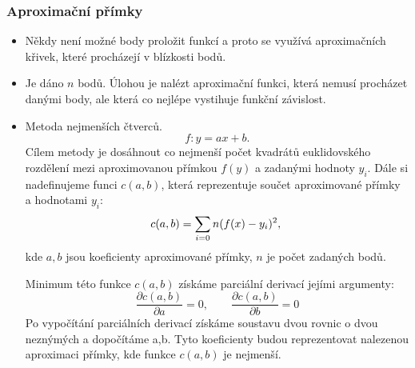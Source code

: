 \subsubsection{Aproximační přímky}
\begin{itemize}
\item Někdy není možné body proložit funkcí a proto se využívá aproximačních křivek, které procházejí v blízkosti bodů.
\item Je dáno $n$ bodů. Úlohou je nalézt aproximační funkci, která nemusí procházet danými body, ale která co nejlépe vystihuje funkční závislost. 
\item Metoda nejmenších čtverců. 
			\begin{equation}
			\label{rovnicePrimky} 
			  f: y = ax + b.
			\end{equation}
			Cílem metody je dosáhnout co nejmenší počet kvadrátů euklidovského rozdělení mezi aproximovanou přímkou $f(y)$ a zadanými hodnoty $y_{i}$. Dále si nadefinujeme funci $c(a,b)$, která reprezentuje součet aproximované přímky a hodnotami $y_{i}$:
			\begin{equation}  
			\label{soucetPrimky}
			  c(a,b) = \sum_{i=0}{n} (f(x) - y_{i})^2, \\
			\end{equation}
			kde $a, b$ jsou koeficienty aproximované přímky, $n$ je počet zadaných bodů. 

			Minimum této funkce $c(a,b)$ získáme parciální derivací jejími argumenty:
			\begin{equation}  
			\label{parcialDerivation}
			  \frac{\partial c(a,b)}{\partial a} = 0,  \quad \quad  \frac{\partial c(a,b)}{\partial b} = 0
			\end{equation}
			Po vypočítání parciálních derivací získáme soustavu dvou rovnic o dvou neznýmých a dopočítáme a,b. Tyto koeficienty budou reprezentovat nalezenou aproximaci přímky, kde funkce $c(a,b)$ je nejmenší.

\end{itemize}
